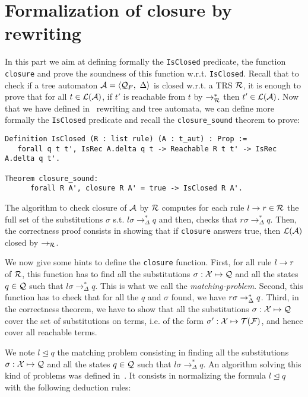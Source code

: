 \section{Formalization of closure by rewriting}
\label{sec:closure}

In this part we aim at defining formally the \lstinline!IsClosed! predicate, the
function \lstinline!closure! and prove the soundness of this function
w.r.t. \lstinline!IsClosed!. Recall that to
check if a tree automaton $\mathcal{A} = \langle \mathcal{Q}_F,\ \Delta \rangle$ is closed
w.r.t. a TRS $\mathcal{R}$, it is enough to prove that for all $t \in {\cal L}(\mathcal{A})$, if
$t'$ is reachable from $t$ by $\rightarrow_{\mathcal{R}}^*$ then $t' \in {\cal L}(\mathcal{A})$. 
Now that we have defined in \coq\ rewriting and tree
automata, we can define more formally the \lstinline!IsClosed! predicate and recall
the \lstinline!closure_sound! theorem to prove:

\begin{lstlisting}
Definition IsClosed (R : list rule) (A : t_aut) : Prop :=
   forall q t t', IsRec A.delta q t -> Reachable R t t' -> IsRec A.delta q t'.

Theorem closure_sound:
      forall R A', closure R A' = true -> IsClosed R A'.
\end{lstlisting}


The algorithm to check closure of $\mathcal{A}$ by $\mathcal{R}$ computes for each rule $l
\rightarrow r \in \mathcal{R}$ the full set of the substitutions $\sigma$ s.t. $l\sigma
\rightarrow_\Delta^* q$ and then, checks that $r\sigma \rightarrow_\Delta^*
q$. Then, the correctness proof consists in showing that if \lstinline!closure!
answers true, then ${\cal L}(\mathcal{A})$ closed by $\rightarrow_{\mathcal{R}}$.

We now give some hints to define the \lstinline!closure! function.  First, for
all rule $l \rightarrow r$ of $\mathcal{R}$, this function has to find all the substitutions
$\sigma:{\cal X} \mapsto \mathcal{Q}$ and all the states $q \in \mathcal{Q}$ such that 
$l\sigma \rightarrow_\Delta^* q$. This is what we call the 
\emph{matching-problem}. Second, this function has to check that for all the $q$
and $\sigma$ found, we have $r\sigma \rightarrow_{\Delta}^* q$. Third, in the
correctness theorem, we have to show that all the substitutions $\sigma:
{\cal X}\mapsto \mathcal{Q}$ cover the set of substitutions on terms, i.e. of the form $\sigma':
{\cal X} \mapsto {\cal T(F)}$, and hence cover all reachable terms.

We note $l \unlhd q$ the matching problem consisting in finding all the
substitutions $\sigma:{\cal X} \mapsto \mathcal{Q}$ and all the states $q \in \mathcal{Q}$ such that
$l\sigma \rightarrow_\Delta^* q$. An algorithm solving this kind of
problems was defined in~\cite{Genet-RR97b}. It consists in normalizing
the formula $l \unlhd q$ with the following deduction rules:

